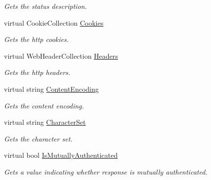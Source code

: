 \begin{DoxyCompactItemize}
\begin{DoxyCompactList}\small\item\em Gets the status description. \end{DoxyCompactList}\item 
virtual Cookie\+Collection \hyperlink{class_accela_1_1_windows_store_s_d_k_1_1_http_web_response_wrapper_a0ec527e75662218f63d5adf821f46080}{Cookies}
\begin{DoxyCompactList}\small\item\em Gets the http cookies. \end{DoxyCompactList}\item 
virtual Web\+Header\+Collection \hyperlink{class_accela_1_1_windows_store_s_d_k_1_1_http_web_response_wrapper_a88a2d20e05f43c1bbb5641f2865656b2}{Headers}
\begin{DoxyCompactList}\small\item\em Gets the http headers. \end{DoxyCompactList}\item 
virtual string \hyperlink{class_accela_1_1_windows_store_s_d_k_1_1_http_web_response_wrapper_aebbd596654ecc95a04e937d4f2028f03}{Content\+Encoding}
\begin{DoxyCompactList}\small\item\em Gets the content encoding. \end{DoxyCompactList}\item 
virtual string \hyperlink{class_accela_1_1_windows_store_s_d_k_1_1_http_web_response_wrapper_a9bcf53e51e0ea614286984e7016ebfaa}{Character\+Set}
\begin{DoxyCompactList}\small\item\em Gets the character set. \end{DoxyCompactList}\item 
virtual bool \hyperlink{class_accela_1_1_windows_store_s_d_k_1_1_http_web_response_wrapper_a59a24248d794ee45138bbd2d24fdb4a3}{Is\+Mutually\+Authenticated}
\begin{DoxyCompactList}\small\item\em Gets a value indicating whether response is mutually authenticated. \end{DoxyCompactList}\item 

\end{DoxyCompactItemize}
